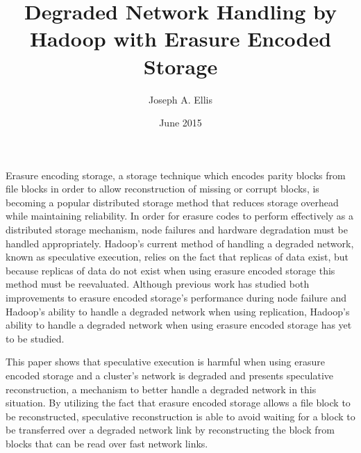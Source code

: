 \documentclass{ucetd}
\title{Degraded Network Handling by Hadoop with Erasure Encoded Storage}
\author{Joseph A. Ellis}
\date{June 2015}
\begin{document}
\maketitle

\makecopyright


\tableofcontents
\listoffigures




\abstract

Erasure encoding storage, a storage technique which encodes parity blocks from
file blocks in order to allow reconstruction of missing or corrupt blocks, is
becoming a popular distributed storage method that reduces storage overhead
while maintaining reliability. In order for erasure codes to perform effectively
as a distributed storage mechanism, node failures and hardware degradation must
be handled appropriately.  Hadoop's current method of handling a degraded
network, known as speculative execution, relies on the fact that replicas of
data exist, but because replicas of data do not exist when using erasure encoded
storage this method must be reevaluated.  Although previous work has studied
both improvements to erasure encoded storage's performance during node failure
and Hadoop's ability to handle a degraded network when using replication,
Hadoop's ability to handle a degraded network when using erasure encoded storage
has yet to be studied.

This paper shows that speculative execution is harmful when using erasure
encoded storage and a cluster's network is degraded and presents speculative
reconstruction, a mechanism to better handle a degraded network in this
situation. By utilizing the fact that erasure encoded storage allows a file
block to be reconstructed, speculative reconstruction is able to avoid waiting
for a block to be transferred over a degraded network link by reconstructing the
block from blocks that can be read over fast network links.

\end{document}
